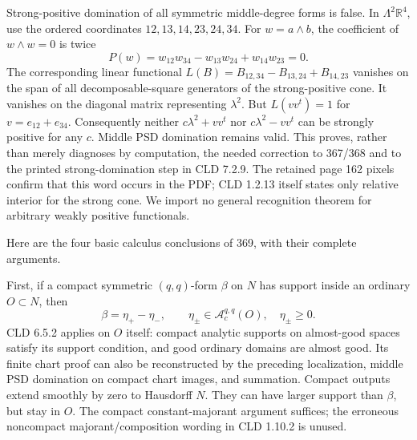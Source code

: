 \documentclass[11pt]{article}
\begin{document}
Strong-positive domination of all symmetric middle-degree forms is false. In \(\Lambda^2\mathbb R^4\), use the ordered coordinates \(12,13,14,23,24,34\). For \(w=a\wedge b\), the coefficient of \(w\wedge w=0\) is twice
\[
 P(w)=w_{12}w_{34}-w_{13}w_{24}+w_{14}w_{23}=0.
\]
The corresponding linear functional \(L(B)=B_{12,34}-B_{13,24}+B_{14,23}\) vanishes on the span of all decomposable-square generators of the strong-positive cone. It vanishes on the diagonal matrix representing \(\lambda^2\). But \(L(vv^t)=1\) for \(v=e_{12}+e_{34}\). Consequently neither \(c\lambda^2+vv^t\) nor \(c\lambda^2-vv^t\) can be strongly positive for any \(c\). Middle PSD domination remains valid. This proves, rather than merely diagnoses by computation, the needed correction to 367/368 and to the printed strong-domination step in CLD 7.2.9. The retained page 162 pixels confirm that this word occurs in the PDF; CLD 1.2.13 itself states only relative interior for the strong cone. We import no general recognition theorem for arbitrary weakly positive functionals.

Here are the four basic calculus conclusions of 369, with their complete arguments.

First, if a compact symmetric \((q,q)\)-form \(\beta\) on \(N\) has support inside an ordinary \(O\subset N\), then
\[
 \beta=\eta_+-\eta_-,\qquad\eta_\pm\in\mathcal A_c^{q,q}(O),\quad\eta_\pm\geq0.
\]
CLD 6.5.2 applies on \(O\) itself: compact analytic supports on almost-good spaces satisfy its support condition, and good ordinary domains are almost good. Its finite chart proof can also be reconstructed by the preceding localization, middle PSD domination on compact chart images, and summation. Compact outputs extend smoothly by zero to Hausdorff \(N\). They can have larger support than \(\beta\), but stay in \(O\). The compact constant-majorant argument suffices; the erroneous noncompact majorant/composition wording in CLD 1.10.2 is unused.
\end{document}
